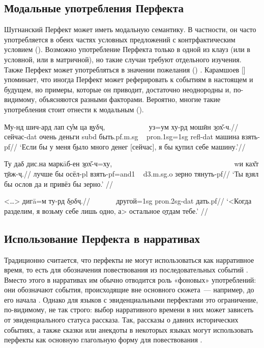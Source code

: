 {{{\subsection{Модальные употребления Перфекта} \label{evid-modal}

Шугнанский Перфект может иметь модальную семантику. В частности, он часто употребляется в обеих частях условных предложений с контрфактическим условием (). Возможно употребление Перфекта только в одной из клауз (или в условной, или в матричной), но такие случаи требуют отдельного изучения. Также Перфект может употребляться в значении пожелания () \parencite[813–814]{edelman_dodykhudoeva2009_shughni}. Карамшоев [\cite*[162]{karamshoev1963}] упоминает, что иногда Перфект может реферировать к событиям в настоящем и будущем, но примеры, которые он приводит, достаточно неоднородны и, по-видимому, объясняются разными факторами. Вероятно, многие такие употребления стоит отнести к модальным ().

\begingl
\gla Му-нд шич-ард лап су̊м ца \b{вуδҷ}, ~~~~~~~~~~~ уз=ум ху-рд мошӣн \b{зох̌-ч}.//
 сейчас-{\sc dat} очень деньги {\sc subd} быть.{\sc pf.m.sg} ~ {\sc pron.1sg=1sg} {\sc refl-dat} машина взять-{\sc pf}//
\glft ‘Если бы у меня \b{было} много денег [сейчас], я бы \b{купил} себе машину.’//
\endgl \xe

\begingl
\gla Ту даδ дис.на маркāб-ен \b{зох̌-ч}=ху, ~~~~~~~~~~~~~~~~~~~~~~~~~~~~~~~~~ wи ках̌т \b{тӣж-ҷ}.//
 лучше бы осёл-{\sc pl} взять-{\sc pf=and1} ~ {\sc d3.m.sg.o} зерно тянуть-{\sc pf}//
\glft ‘Ты \b{взял} бы ослов да и \b{привёз} бы зерно.’ //
\endgl \xe

\begingl
\gla <…> дигā=м ту-рд \b{δоδҷ}.//
\glc ~~~~~~ другой={\sc 1sg} {\sc pron.2sg-dat} дать.{\sc pf}//
\glft ‘<Когда разделим, я возьму себе лишь одно, а> остальное \b{отдам} тебе.’ //
\endgl \xe

\subsection{Использование Перфекта в нарративах} \label{evid-narr}

Традиционно считается, что перфекты не могут использоваться как нарративное время, то есть для обозначения повествования из последовательных событий \parencites[138]{dahl1985}[366]{lindstedt2000}. Вместо этого в нарративах им обычно отводится роль «фоновых» употреблений: они обозначают события, происходящие вне основного сюжета~— например, до его начала \parencite[62]{bybee_etal1994}. Однако для языков с эвиденциальными перфектами это ограничение, по-видимому, не так строго: выбор нарративного времени в них может зависеть от эвиденциального статуса рассказа. Так, рассказы о давних исторических событиях, а также сказки или анекдоты в некоторых языках могут использовать перфекты как основную глагольную форму для повествования \parencites[151–152]{dahl1985}[99]{lazard1999}.

}}}
